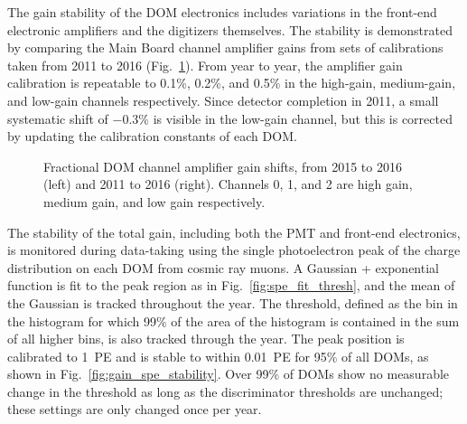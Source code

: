 The gain stability of the DOM electronics includes variations in the
front-end electronic amplifiers and the digitizers themselves.  The
stability is demonstrated by comparing the Main Board channel amplifier gains
from sets of calibrations taken from 2011 to 2016
(Fig.~\ref{fig:domcal_ch_gain}).  From year to year, the amplifier gain 
calibration is repeatable to 0.1\%, 0.2\%, and 0.5\% in the high-gain,
medium-gain, and low-gain channels respectively.  Since detector completion
in 2011, a small systematic shift of $-0.3\%$ is visible in the low-gain
channel, but this is corrected by updating the calibration constants of
each DOM.

\begin{figure}[!h]
  \captionsetup[subfigure]{labelformat=empty}
  \centering
  \caption{Fractional DOM channel amplifier gain shifts, from 2015 to
    2016 (left) and 2011 to 2016 (right).  Channels 0, 1, and 2 are
    high gain, medium gain, and low gain respectively.}
  \label{fig:domcal_ch_gain}
\end{figure}

The stability of the total gain, including both the PMT and
front-end electronics, is monitored during data-taking using the
single photoelectron peak of the charge distribution on each DOM from
cosmic ray muons. A
Gaussian + exponential function is fit to the peak region as in
Fig.~\ref{fig:spe_fit_thresh}, and the mean of the Gaussian is
tracked throughout the year. The threshold, defined as the bin in the histogram for which 99\% of the area of the histogram is contained in the sum of all higher bins, is also tracked through
the year. The peak position is calibrated to 1~PE
and is stable to within 0.01~PE for 95\% of all DOMs, as shown in
Fig.~\ref{fig:gain_spe_stability}. Over 99\% of DOMs show no
measurable change in the threshold as long as the discriminator
thresholds are unchanged; these settings are only changed once per year.

